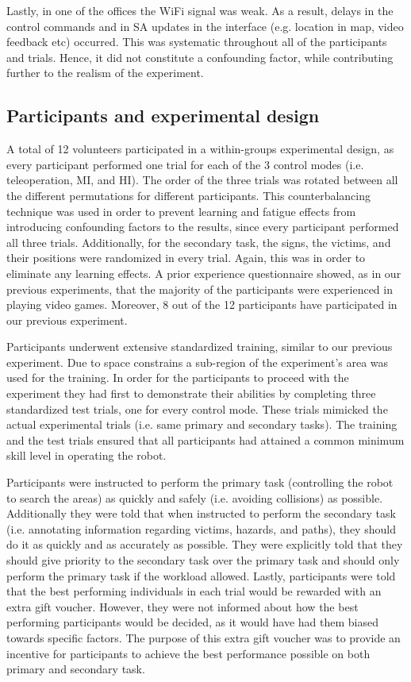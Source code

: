 \documentclass[a4paper,12pt,oneside,openright]{bhamthesis}
\begin{document}
Lastly, in one of the offices the WiFi signal was weak. As a result, delays in the control commands and in SA updates in the interface (e.g. location in map, video feedback etc) occurred. This was systematic throughout all of the participants and trials. Hence, it did not constitute a confounding factor, while contributing further to the realism of the experiment.


\subsection{Participants and experimental design}
A total of 12 volunteers participated in a within-groups experimental design, as every participant performed one trial for each of the 3 control modes (i.e. teleoperation, MI, and HI). The order of the three trials was rotated between all the different permutations for different participants. This counterbalancing technique was used in order to prevent learning and fatigue effects from introducing confounding factors to the results, since every participant performed all three trials. Additionally, for the secondary task, the signs, the victims, and their positions were randomized in every trial. Again, this was in order to eliminate any learning effects. A prior experience questionnaire showed, as in our previous experiments, that the majority of the participants were experienced in playing video games. Moreover, 8 out of the 12 participants have participated in our previous experiment. 

Participants underwent extensive standardized training, similar to our previous experiment. Due to space constrains a sub-region of the experiment's area was used for the training. In order for the participants to proceed with the experiment they had first to demonstrate their abilities by completing three standardized test trials, one for every control mode. These trials mimicked the actual experimental trials (i.e. same primary and secondary tasks). The training and the test trials ensured that all participants had attained a common minimum skill level in operating the robot. 

Participants were instructed to perform the primary task (controlling the robot to search the areas) as quickly and safely (i.e. avoiding collisions) as possible. Additionally they were told that when instructed to perform the secondary task (i.e. annotating information regarding victims, hazards, and paths), they should do it as quickly and as accurately as possible. They were explicitly told that they should give priority to the secondary task over the primary task and should only perform the primary task if the workload allowed. Lastly, participants were told that the best performing individuals in each trial would be rewarded with an extra gift voucher. However, they were not informed about how the best performing participants would be decided, as it would have had them biased towards specific factors. The purpose of this extra gift voucher was to provide an incentive for participants to achieve the best performance possible on both primary and secondary task.
\end{document}
